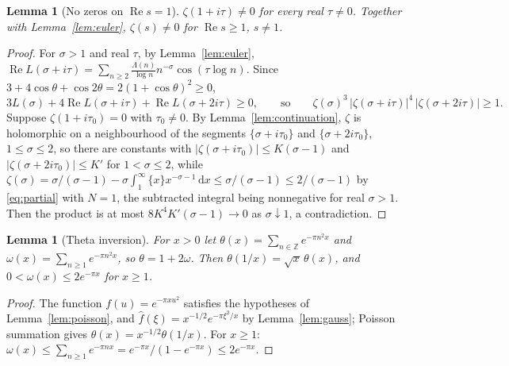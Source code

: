 \documentclass[11pt]{article}
\newtheorem{lemma}[theorem]{Lemma}
\theoremstyle{definition}
\newcommand{\Z}{\mathbb{Z}}
\newcommand{\Lam}{\Lambda}
\newcommand{\re}{\operatorname{Re}}
\newcommand{\dd}{\,\mathrm{d}}
\begin{document}
\begin{lemma}[No zeros on $\re s=1$]\label{lem:mertens}
$\zeta(1+i\tau)\ne0$ for every real $\tau\ne0$. Together with Lemma~\ref{lem:euler}, $\zeta(s)\ne0$ for $\re s\ge1$, $s\ne1$.
\end{lemma}
\begin{proof}
For $\sigma>1$ and real $\tau$, by Lemma~\ref{lem:euler},
$\re L(\sigma+i\tau)=\sum_{n\ge2}\frac{\Lam(n)}{\log n}n^{-\sigma}\cos(\tau\log n)$.
Since $3+4\cos\theta+\cos2\theta=2(1+\cos\theta)^{2}\ge0$,
\[
3L(\sigma)+4\re L(\sigma+i\tau)+\re L(\sigma+2i\tau)\ge0,\qquad\text{so}\qquad
\zeta(\sigma)^{3}\,|\zeta(\sigma+i\tau)|^{4}\,|\zeta(\sigma+2i\tau)|\ge1 .
\]
Suppose $\zeta(1+i\tau_0)=0$ with $\tau_0\ne0$.
By Lemma~\ref{lem:continuation}, $\zeta$ is holomorphic on a neighbourhood of the segments $\{\sigma+i\tau_0\}$ and $\{\sigma+2i\tau_0\}$, $1\le\sigma\le2$, so there are constants with
$|\zeta(\sigma+i\tau_0)|\le K(\sigma-1)$ and $|\zeta(\sigma+2i\tau_0)|\le K'$ for $1<\sigma\le2$,
while $\zeta(\sigma)=\sigma/(\sigma-1)-\sigma\int_1^\infty\{x\}x^{-\sigma-1}\dd x\le\sigma/(\sigma-1)\le 2/(\sigma-1)$ by \eqref{eq:partial} with $N=1$, the subtracted integral being nonnegative for real $\sigma>1$.
Then the product is at most $8K^{4}K'(\sigma-1)\to0$ as $\sigma\downarrow1$, a contradiction.
\end{proof}

\begin{lemma}[Theta inversion]\label{lem:theta}
For $x>0$ let $\theta(x)=\sum_{n\in\Z}e^{-\pi n^{2}x}$ and $\omega(x)=\sum_{n\ge1}e^{-\pi n^{2}x}$, so $\theta=1+2\omega$.
Then $\theta(1/x)=\sqrt{x}\,\theta(x)$, and $0<\omega(x)\le 2e^{-\pi x}$ for $x\ge1$.
\end{lemma}
\begin{proof}
The function $f(u)=e^{-\pi xu^{2}}$ satisfies the hypotheses of Lemma~\ref{lem:poisson}, and $\widehat f(\xi)=x^{-1/2}e^{-\pi\xi^{2}/x}$ by Lemma~\ref{lem:gauss}; Poisson summation gives $\theta(x)=x^{-1/2}\theta(1/x)$.
For $x\ge1$: $\omega(x)\le\sum_{n\ge1}e^{-\pi nx}=e^{-\pi x}/(1-e^{-\pi x})\le2e^{-\pi x}$.
\end{proof}
\end{document}
